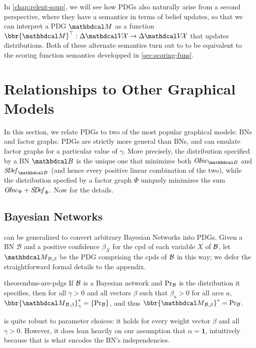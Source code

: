 In \cref{chap:relent-soup}, we will see how PDGs also naturally arise from a second perspective, where they have a semantics in terms of belief updates, so that we can interpret a PDG $\dg M$ as a function $\bbr{\dg M}^\top : \Delta \V\!\X \to \Delta \V\!\X$
that updates distributions.
%
Both of these alternate semantics turn out to to be equivalent to the scoring function semantics developped in \cref{sec:scoring-funs}. 

\section{Relationships to Other Graphical Models}
    \label{sec:other-graphical-models} 

In this section, we relate
PDGs to two of the most popular graphical models: 
BNs and factor graphs.
PDGs are strictly more general than BNs, and can emulate factor graphs for a particular value of $\gamma$. 
More precisely, the distribution specified by a BN $\dg B$
is the unique one that minimizes both $\OInc_{\dg B}$ and $\SDef_{\dg B}$ (and hence every positive linear combination of the two), while the
distribution specfied by a factor graph $\Phi$ uniquely minimizes the
sum $\mathit{O\mskip-2.5muI\mskip-3.5mun\mskip-1.7muc}_{\Phi} + \mathit{S\mskip-3.5muD\mskip-2.5mue\mskip-1.5muf}_{\Phi}$.
Now for the details.

\subsection{Bayesian Networks} 
    \label{sec:bn-convert}

 can be generalized to convert arbitrary Bayesian Networks into PDGs.
Given a BN $\mathcal B$ and a positive confidence $\beta_X$ for
the cpd of each variable $X$ of $\cal B$,
let $\PDGof{\mathcal B, \beta}$
be the PDG comprising the cpds of $\cal B$
in this way; we defer the straightforward formal details to the appendix. 

	
\begin{linked}{theorem}{bns-are-pdgs}
 	  If $\cal B$ is a Bayesian network
          and $\Pr_{\cal B}$ is the distribution it specifies, then
        for all $\gamma > 0$ and all vectors $\beta$ such
        that $\beta_a > 0$ for all arcs $a$,
        $\bbr{\PDGof{\mathcal B, \beta}}_\gamma^* = \{ \Pr_{\cal B}\}$, 
and thus $\bbr{\PDGof{\mathcal B, \beta}}^* = \Pr_{\cal B}$.    
\end{linked}
 is quite robust to parameter choices: it holds for every
weight vector $\beta$ and all $\gamma > 0$.
However, it does lean heavily on our assumption that $\alpha = \mathbf 1$, intuitively because that is what encodes the BN's independencies. 



